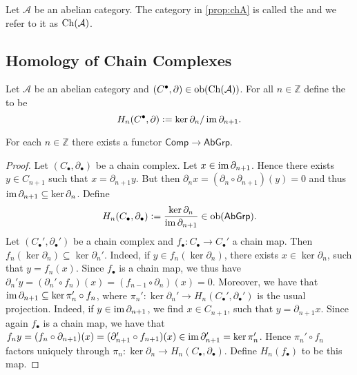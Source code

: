 \begin{definition}[$\Ch(\mathcal{A})$]
	Let $\mathcal{A}$ be an abelian category. The category in \ref{prop:chA} is called the  and we refer to it as $\Ch(\mathcal{A})$.
\end{definition}

\subsection*{Homology of Chain Complexes}

\begin{definition}[Homology]
	Let $\mathcal{A}$ be an abelian category and $(C^\bullet,\partial) \in \operatorname{ob}(\operatorname{Ch}(\mathcal{A}))$. For all $n \in \mathbb{Z}$ define the  to be
	\begin{equation}
		H_n(C^\bullet,\partial) := \ker \partial_n / \operatorname{im} \partial_{n + 1}.	
	\end{equation}
\end{definition}

\begin{proposition}
	For each $n \in \mathbb{Z}$ there exists a functor $\mathsf{Comp} \to \mathsf{AbGrp}$.
	\label{prop:homology_functor}
\end{proposition}

\begin{proof}
	Let $(C_\bullet,\partial_\bullet)$ be a chain complex. Let $x \in \operatorname{im} \partial_{n + 1}$. Hence there exists $y \in C_{n + 1}$ such that $x = \partial_{n + 1}y$. But then $\partial_nx = (\partial_n \circ \partial_{n + 1})(y) = 0$ and thus $\operatorname{im} \partial_{n + 1} \subseteq \ker \partial_n$. Define
	\begin{equation*}
		H_n(C_\bullet,\partial_\bullet) := \frac{\ker \partial_n}{\operatorname{im} \partial_{n + 1}} \in \operatorname{ob}(\mathsf{AbGrp}).
	\end{equation*}
	Let $(C_\bullet',\partial_\bullet')$ be a chain complex and $f_\bullet : C_\bullet \to C_\bullet'$ a chain map. Then $f_n(\ker\partial_n) \subseteq \ker \partial_n'$. Indeed, if $y \in f_n(\ker\partial_n)$, there exists $x \in \ker\partial_n$, such that $y = f_n(x)$. Since $f_\bullet$ is a chain map, we thus have $\partial_n'y = (\partial_n' \circ f_n)(x) = (f_{n - 1} \circ \partial_n)(x) = 0$. Moreover, we have that $\operatorname{im} \partial_{n + 1} \subseteq \ker \pi_n' \circ f_n$, where $\pi_n' : \ker \partial_n' \to H_n(C_\bullet',\partial_\bullet')$ is the usual projection. Indeed, if $y \in \operatorname{im} \partial_{n + 1}$, we find $x \in C_{n + 1}$, such that $y = \partial_{n + 1}x$. Since again $f_\bullet$ is a chain map, we have that $f_ny = (f_n \circ \partial_{n + 1})(x) = (\partial_{n + 1}' \circ f_{n + 1})(x) \in \operatorname{im} \partial_{n + 1}' = \ker \pi_n'$. Hence $\pi_n' \circ f_n$ factors uniquely through $\pi_n : \ker \partial_n \to H_n(C_\bullet,\partial_\bullet)$. Define $H_n(f_\bullet)$ to be this map. 
\end{proof}

